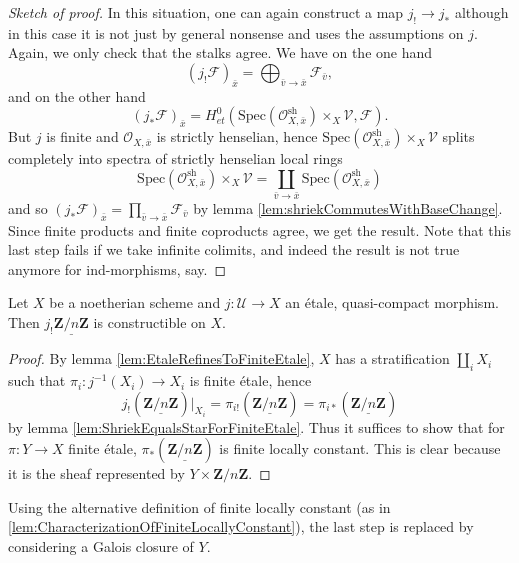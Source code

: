 \begin{proof}[Sketch of proof] 
In this situation, one can again construct a map $j_! \to j_*$ although in this 
case it is not just by general nonsense and uses the assumptions on $j$. Again, 
we only check that the stalks agree. We have on the one hand
$$
(j_!\mathcal{F})_{\bar x} = 
\bigoplus_{\bar v \to \bar x} \mathcal{F}_{\bar v},
$$
and on the other hand
$$
\left(j_* \mathcal{F} \right)_{\bar x} = H_{et}^0(\text{Spec}(\mathcal{O}_{X, 
\bar x}^\text{sh})\times_X \mathcal{V}, \mathcal{F}).
$$
But $j$ is finite and $\mathcal{O}_{X, \bar x}$ is strictly henselian, hence 
$\text{Spec}(\mathcal{O}_{X, \bar x}^\text{sh})\times_X \mathcal{V}$ splits 
completely into spectra of strictly henselian  local rings
$$
\text{Spec}(\mathcal{O}_{X, \bar x}^\text{sh})\times_X \mathcal{V} = 
\coprod_{\bar v \to \bar x} \text{Spec}(\mathcal{O}_{X, \bar x}^\text{sh})
$$
and so $\left(j_* \mathcal{F} \right)_{\bar x} = \prod_{\bar v \to \bar 
x} \mathcal{F}_{\bar v}$ by lemma \ref{lem:shriekCommutesWithBaseChange}. Since 
finite products and finite coproducts agree, we get the result. Note that this 
last step fails if we take infinite colimits, and indeed the result is not true 
anymore for ind-morphisms, say.
\end{proof}

\begin{lemma} 
Let $X$ be a noetherian scheme and $j: \mathcal{U} \to X$ an \'etale, 
quasi-compact morphism. Then $j_!\underline{\mathbf{Z}/n\mathbf{Z}}$ is 
constructible on $X$. 
\end{lemma}

\begin{proof} 
By lemma \ref{lem:EtaleRefinesToFiniteEtale}, $X$ has a stratification 
$\coprod_i X_i$ such that $\pi_i: j^{-1}(X_i)\to X_i$ is finite \'etale, hence
$$
j_!(\underline{\mathbf{Z}/n\mathbf{Z}})|_{X_i} = 
\pi_{i!}(\underline{\mathbf{Z}/n\mathbf{Z}}) = 
\pi_{i*}(\underline{\mathbf{Z}/n\mathbf{Z}})
$$
by lemma \ref{lem:ShriekEqualsStarForFiniteEtale}. Thus it suffices to show 
that for $\pi: Y\to X$ finite \'etale, 
$\pi_*(\underline{\mathbf{Z}/n\mathbf{Z}})$ is finite locally constant. This is 
clear because it is the sheaf represented by $Y\times \mathbf{Z}/n\mathbf{Z}$.
\end{proof}

\begin{remark}
Using the alternative definition of finite locally constant (as in 
\ref{lem:CharacterizationOfFiniteLocallyConstant}), the last step is replaced 
by considering a Galois closure of $Y$.
\end{remark}

